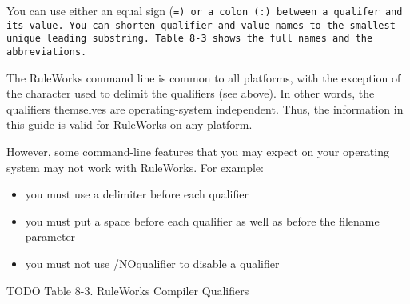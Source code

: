 You can use either an equal sign (\tt{=}) or a colon (\verb|:|)
between a qualifer and its value. You can shorten qualifier and value
names to the smallest unique leading substring. Table 8-3 shows the
full names and the abbreviations.

\begin{note}
  The RuleWorks command line is common to all platforms, with the
  exception of the character used to delimit the qualifiers (see
  above). In other words, the qualifiers themselves are
  operating-system independent.  Thus, the information in this guide
  is valid for RuleWorks on any platform.
\end{note}

However, some command-line features that you may expect on your
operating system may not work with RuleWorks.  For example:

\begin{itemize}
\item you must use a delimiter before each qualifier
\item you must put a space before each qualifier as well as before the
  filename parameter
\item you must not use /NOqualifier to disable a qualifier
\end{itemize}
  

TODO
Table 8-3. RuleWorks Compiler Qualifiers

